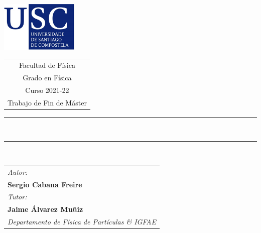 \documentclass[12 pt, a4paper]{article} %
\numberwithin{equation}{section}
\numberwithin{figure}{section}
\begin{document}
	\begin{center}
		\vspace{3em}
		\includegraphics[width=10em]{figures/USC.png}
		\hspace{1cm}
		\begin{tabular}[b]{c}
			{\large\color{usc} \sc Facultad de Física} \vspace{0.5em}\\
			{\large\color{usc} \sc Grado en Física } \vspace{0.5em}\\  %
			{\large\color{usc}  Curso 2021-22} \vspace{0.5em}\\%
			{\Large\color{usc} \sc Trabajo de Fin de Máster} %
		\end{tabular}
		
		
		
		\vspace{3cm}
		\rule{65mm}{0.2mm}\\
		\vspace{1cm}
		
		{\sc\LARGE \TituloDoTraballo}
		
		{\sl\large \EspecialidadeMaster}
		
		
		
		\vspace{0.5cm}
		\rule{65mm}{0.2mm}\\
		\vspace{2cm}
	\end{center}
	
	
	\begin{tabular}{l}
		{\sl\large Autor:} \\
		{\bf\Large Sergio Cabana Freire} %
		\vspace{1em}\mbox{} \\
		{\sl\large Tutor:} \\
		{\bf\large Jaime Álvarez Muñiz} \\
		{\sl\large Departamento de Física de Partículas \& IGFAE}
		\vspace{1em}\mbox{} \\
	\end{tabular}
	
\end{document}
